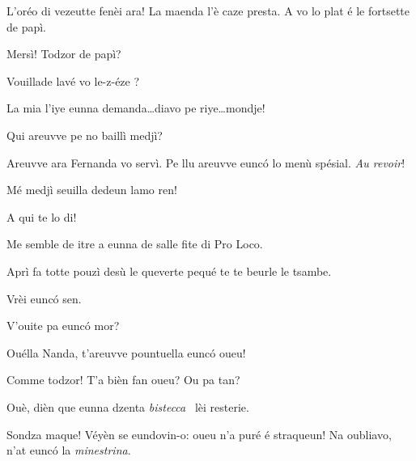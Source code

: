 \begin{drama}

\Eunfeurmiespeaks L’oréo di vezeutte fenèi ara! La maenda l’è caze pre\-sta.  A vo lo plat é le fortsette de papì.


\Gerominespeaks Mersì! Todzor de papì?

\Eunfeurmiespeaks Vouillade lavé vo le-z-éze \posate?

\Gerominespeaks La mia l'iye eunna demanda\ldots diavo pe riye\ldots mondje!

\Casimirspeaks Qui areuvve pe no baillì medjì?

\Eunfeurmiespeaks Areuvve ara Fernanda vo servì.  Pe llu  areuvve eunc\'o lo menù spésial. \textit{Au revoir}!


\Casimirspeaks{} Mé medjì seuilla dedeun lamo ren!

\Gerominespeaks A qui te lo di!

\Casimirspeaks Me semble de itre a eunna de salle fite di Pro Loco.

\Gerominespeaks Aprì fa totte pouzì desù le queverte pequé te te beurle le tsambe.

\Casimirspeaks Vrèi eunc\'o sen.




\Fernandaspeaks V'ouite pa eunc\'o mor?

\Casimirspeaks Ouélla Nanda, t’areuvve pountuella eunc\'o oueu!

\Fernandaspeaks Comme todzor! T’a bièn fan oueu? Ou pa tan?

\Casimirspeaks Ouè, dièn que eunna dzenta \textit{bistecca} \bistecca\ lèi resterie.

\Gerominespeaks Sondza maque! Véyèn se eundovin-o: oueu n’a puré é straqueun! Na oubliavo, n’at eunc\'o la \textit{minestrina}.


\end{drama}
